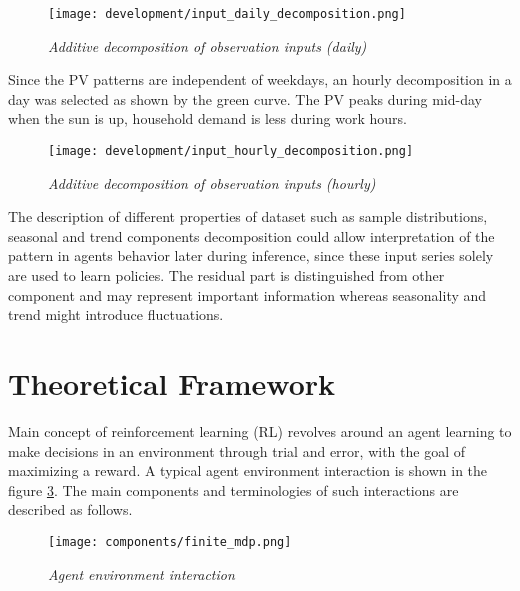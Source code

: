 \begin{large}
\begin{figure}[h]
	\begin{center}
		\texttt{[image: development/input\_daily\_decomposition.png]}
		\caption{ \textit{Additive decomposition of observation inputs (daily)}}
		\label{fig:dev_input_decompose_daily}
	\end{center}
\end{figure}

Since the PV patterns are independent of weekdays, an hourly decomposition in a day was selected as shown by the green curve. The PV peaks during mid-day when the sun is up, household demand is less during work hours. \\

\begin{figure}[h]
	\begin{center}
		\texttt{[image: development/input\_hourly\_decomposition.png]}
		\caption{ \textit{Additive decomposition of observation inputs (hourly)} }
		\label{fig:dev_input_decompose_hourly}
	\end{center}
\end{figure}

The description of different properties of dataset such as sample distributions, seasonal and trend components decomposition could allow interpretation of the pattern in agents behavior later during inference, since these input series solely are used to learn policies. The residual part is distinguished from other component and may represent important information whereas seasonality and trend might introduce fluctuations. \\

\section{Theoretical Framework}

Main concept of reinforcement learning (RL) revolves around an agent learning to make decisions in an environment through trial and error, with the goal of maximizing a reward. A typical agent environment interaction\cite{rlintro} is shown in the figure \ref{fig:fmdp}. The main components and terminologies of such interactions are described as follows.\\


\begin{figure}[h]
	\begin{center}
		\texttt{[image: components/finite\_mdp.png]}
		\caption{ \textit{Agent environment interaction}}
		\label{fig:fmdp}
	\end{center}
\end{figure}



\end{large}
